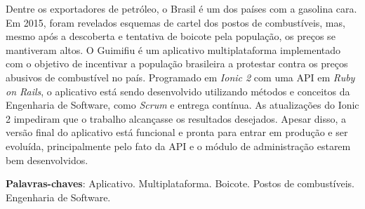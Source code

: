 \begin{resumo}

Dentre os exportadores de petróleo, o Brasil é um dos países com a gasolina cara. Em 2015, foram revelados esquemas de cartel dos postos de combustíveis, mas, mesmo após a descoberta e tentativa de boicote pela população, os preços se mantiveram altos. O Guimifiu é um aplicativo multiplataforma implementado com o objetivo de incentivar a população brasileira a protestar contra os preços abusivos de combustível no país. Programado em \textit{Ionic 2} com uma API em \textit{Ruby on Rails}, o aplicativo está sendo desenvolvido utilizando métodos e conceitos da Engenharia de Software, como \textit{Scrum} e entrega contínua. As atualizações do Ionic 2 impediram que o trabalho alcançasse os resultados desejados. Apesar disso, a versão final do aplicativo está funcional e pronta para entrar em produção e ser evoluída, principalmente pelo fato da API e o módulo de administração estarem bem desenvolvidos.

 \vspace{\onelineskip}

 \noindent
 \textbf{Palavras-chaves}: Aplicativo. Multiplataforma. Boicote. Postos de combustíveis. Engenharia de Software. 
\end{resumo}
